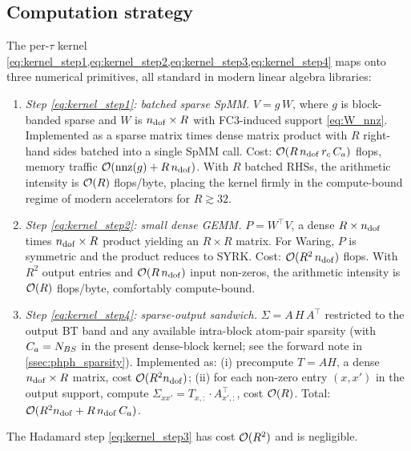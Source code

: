 \subsection{Computation strategy}
\label{ssec:phph_decomp_compute}

The per-$\tau$ kernel
\cref{eq:kernel_step1,eq:kernel_step2,eq:kernel_step3,eq:kernel_step4}
maps onto three numerical primitives, all standard in modern linear
algebra libraries:
\begin{enumerate}
  \item \emph{Step \cref{eq:kernel_step1}: batched sparse SpMM.}
        $V = g\,W$, where $g$ is block-banded sparse and $W$ is
        $n_{\mathrm{dof}}\times R$ with FC3-induced support \cref{eq:W_nnz}.
        Implemented as a sparse matrix times dense matrix product
        with $R$ right-hand sides batched into a single SpMM call.
        Cost: $\mathcal{O}(R\,n_{\mathrm{dof}}\,r_c\,C_a)$ flops, memory traffic
        $\mathcal{O}(\mathrm{nnz}(g) + R\,n_{\mathrm{dof}})$. With $R$ batched RHSs,
        the arithmetic intensity is $\mathcal{O}(R)$ flops/byte, placing the
        kernel firmly in the compute-bound regime of modern
        accelerators for $R\gtrsim 32$.
  \item \emph{Step \cref{eq:kernel_step2}: small dense GEMM.}
        $P = W^{\!\top}V$, a dense $R\times n_{\mathrm{dof}}$ times $n_{\mathrm{dof}}\times R$
        product yielding an $R\times R$ matrix.
        For Waring, $P$ is symmetric and the product reduces to
        SYRK. Cost: $\mathcal{O}(R^{2}\,n_{\mathrm{dof}})$ flops. With $R^{2}$ output
        entries and $\mathcal{O}(R\,n_{\mathrm{dof}})$ input non-zeros, the arithmetic
        intensity is $\mathcal{O}(R)$ flops/byte, comfortably
        compute-bound.
  \item \emph{Step \cref{eq:kernel_step4}: sparse-output sandwich.}
        $\Sigma = A\,H\,A^{\!\top}$ restricted to the output BT band
        and any available intra-block atom-pair sparsity
        (with $C_a=N_{BS}$ in the present dense-block kernel; see the
        forward note in \cref{ssec:phph_sparsity}).
        Implemented as: (i) precompute $T=AH$, a dense $n_{\mathrm{dof}}\times R$
        matrix, cost $\mathcal{O}(R^{2}n_{\mathrm{dof}})$; (ii) for each non-zero
        entry $(x,x')$ in the output support, compute
        $\Sigma_{xx'}=T_{x,:}\cdot A_{x',:}^{\!\top}$, cost
        $\mathcal{O}(R)$. Total: $\mathcal{O}(R^{2}n_{\mathrm{dof}} + R\,n_{\mathrm{dof}}\,C_a)$.
\end{enumerate}
The Hadamard step \cref{eq:kernel_step3} has cost $\mathcal{O}(R^{2})$ and
is negligible.

